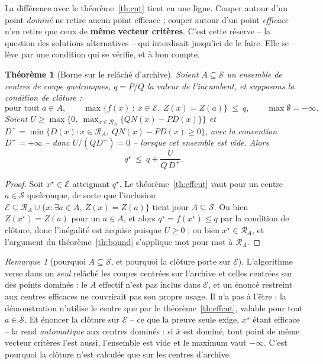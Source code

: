 \documentclass[11pt,a4paper]{article}
\theoremstyle{plain}
\newtheorem{theorem}{Théorème}
\theoremstyle{remark}
\newtheorem{remark}{Remarque}
\newcommand{\Ecal}{\mathcal{E}}
\newcommand{\Scal}{\mathcal{S}}
\newcommand{\Rcal}{\mathcal{R}}
\newcommand{\qs}{q^{\star}}
\begin{document}
\noindent
La différence avec le théorème~\ref{th:cut} tient en une ligne. Couper autour
d'un point \emph{dominé} ne retire aucun point efficace ; couper autour d'un
point \emph{efficace} n'en retire que ceux de \textbf{même vecteur
critères}. C'est cette réserve -- la question des solutions alternatives --
qui interdisait jusqu'ici de le faire. Elle se lève par une condition qui se
vérifie, et à bon compte.

\begin{theorem}[Borne sur le relâché d'archive]\label{th:archbound}
Soient $A\subseteq\Scal$ un ensemble de centres de coupe \emph{quelconques},
$q=P/Q$ la valeur de l'incumbent, et supposons la \emph{condition de
clôture} :
\[
  \text{pour tout } a\in A,\qquad
  \max\{f(x)\ :\ x\in\Ecal,\ Z(x)=Z(a)\}\ \le\ q ,
  \qquad \max\emptyset=-\infty .
\]
Soient $U\ge\max\bigl\{0,\ \max_{x\in\Rcal_A}\{QN(x)-PD(x)\}\bigr\}$ et
$D^{+}=\min\{D(x):x\in\Rcal_A,\ QN(x)-PD(x)\ge 0\}$, avec la convention
$D^{+}=+\infty$ -- donc $U/(QD^{+})=0$ -- lorsque cet ensemble est vide. Alors
\[
  \qs\ \le\ q+\frac{U}{Q\,D^{+}} .
\]
\end{theorem}

\begin{proof}
Soit $x^\star\in\Ecal$ atteignant $\qs$. Le théorème~\ref{th:effcut} vaut
pour un centre $a\in\Scal$ quelconque, de sorte que l'inclusion
$\Ecal\subseteq\Rcal_A\cup\{x:\exists a\in A,\ Z(x)=Z(a)\}$ tient pour
$A\subseteq\Scal$. Ou bien $Z(x^\star)=Z(a)$ pour un $a\in A$, et alors
$\qs=f(x^\star)\le q$ par la condition de clôture, donc l'inégalité est
acquise puisque $U\ge 0$ ; ou bien $x^\star\in\Rcal_A$, et l'argument du
théorème~\ref{th:bound} s'applique mot pour mot à $\Rcal_A$.
\end{proof}

\begin{remark}[pourquoi $A\subseteq\Scal$, et pourquoi la clôture porte sur
$\Ecal$]
L'algorithme verse dans un \emph{seul} relâché les coupes centrées sur
l'archive et celles centrées sur des points dominés : le $A$ effectif n'est
pas inclus dans $\Ecal$, et un énoncé restreint aux centres efficaces ne
couvrirait pas son propre usage. Il n'a pas à l'être : la démonstration
n'utilise le centre que par le théorème~\ref{th:effcut}, valable pour tout
$a\in\Scal$. Et énoncer la clôture sur $\Ecal$ -- ce que la preuve seule
exige, $x^\star$ étant efficace -- la rend \emph{automatique} aux centres
dominés : si $\bar x$ est dominé, tout point de même vecteur critères l'est
aussi, l'ensemble est vide et le maximum vaut $-\infty$. C'est pourquoi la
clôture n'est calculée que sur les centres d'archive.
\end{remark}
\end{document}
